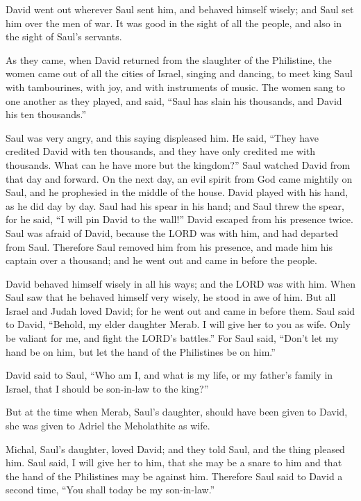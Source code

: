  David went out wherever Saul sent him, and behaved himself
wisely; and Saul set him over the men of war. It was good in the sight
of all the people, and also in the sight of Saul's servants.

 As they came, when David returned from the slaughter of the
Philistine, the women came out of all the cities of Israel, singing and
dancing, to meet king Saul with tambourines, with joy, and with
instruments of music.  The women sang to one another as they
played, and said, ``Saul has slain his thousands, and David his ten
thousands.''

 Saul was very angry, and this saying displeased him. He
said, ``They have credited David with ten thousands, and they have only
credited me with thousands. What can he have more but the kingdom?''
 Saul watched David from that day and forward. 
On the next day, an evil spirit from God came mightily on Saul, and he
prophesied in the middle of the house. David played with his hand, as he
did day by day. Saul had his spear in his hand;  and Saul
threw the spear, for he said, ``I will pin David to the wall!'' David
escaped from his presence twice.  Saul was afraid of David,
because the LORD was with him, and had departed from Saul. 
Therefore Saul removed him from his presence, and made him his captain
over a thousand; and he went out and came in before the people.

 David behaved himself wisely in all his ways; and the LORD
was with him.  When Saul saw that he behaved himself very
wisely, he stood in awe of him.  But all Israel and Judah
loved David; for he went out and came in before them.  Saul
said to David, ``Behold, my elder daughter Merab. I will give her to you
as wife. Only be valiant for me, and fight the LORD's battles.'' For
Saul said, ``Don't let my hand be on him, but let the hand of the
Philistines be on him.''

 David said to Saul, ``Who am I, and what is my life, or my
father's family in Israel, that I should be son-in-law to the king?''

 But at the time when Merab, Saul's daughter, should have
been given to David, she was given to Adriel the Meholathite as wife.

 Michal, Saul's daughter, loved David; and they told Saul,
and the thing pleased him.  Saul said, I will give her to
him, that she may be a snare to him and that the hand of the Philistines
may be against him. Therefore Saul said to David a second time, ``You
shall today be my son-in-law.''

